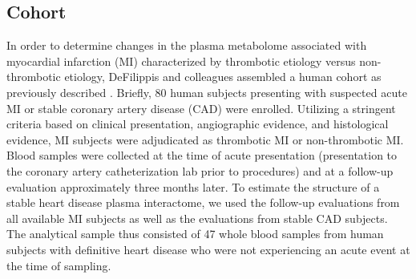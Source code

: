 \label{hdInteractome}
\begin{DoubleSpace*}
\section{Cohort}
In order to determine changes in the plasma metabolome associated with myocardial infarction (MI) characterized by thrombotic etiology versus non-thrombotic etiology, DeFilippis and colleagues assembled a human cohort as previously described \cite{defilippis2015,defilippis2017,trainor2017}. Briefly, 80 human subjects presenting with suspected acute MI or stable coronary artery disease (CAD) were enrolled. Utilizing a stringent criteria based on clinical presentation, angiographic evidence, and histological evidence, MI subjects were adjudicated as thrombotic MI or non-thrombotic MI. Blood samples were collected at the time of acute presentation (presentation to the coronary artery catheterization lab prior to procedures) and at a follow-up evaluation approximately three months later. To estimate the structure of a stable heart disease plasma interactome, we used the follow-up evaluations from all available MI subjects as well as the evaluations from stable CAD subjects. The analytical sample thus consisted of 47 whole blood samples from human subjects with definitive heart disease who were not experiencing an acute event at the time of sampling. 


\end{DoubleSpace*}
